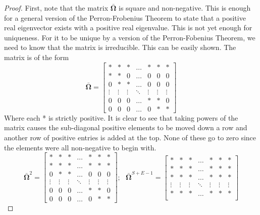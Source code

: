 \documentclass[letterpaper,12pt]{article}
\theoremstyle{definition}
\begin{document}
    \begin{proof}
      First, note that the matrix $\bm{\bar{\Omega}}$ is square and non-negative. This is enough for a general version of the Perron-Frobenius Theorem to state that a positive real eigenvector exists with a positive real eigenvalue. This is not yet enough for uniqueness. For it to be unique by a version of the Perron-Fobenius Theorem, we need to know that the matrix is irreducible. This can be easily shown. The matrix is of the form
      $$\bm{\bar{\Omega}} =
      \begin{bmatrix}
        * & *  & * & \hdots & * & * & *\\
        * & * & 0 & \hdots & 0 & 0 & 0 \\
        0 & * & * & \hdots & 0 & 0 & 0 \\
        \vdots & \vdots & \vdots & \ddots & \vdots & \vdots & \vdots \\
        0 & 0 & 0 & \hdots & *  & * & 0 \\
        0 & 0 & 0 & \hdots & 0 & * & *
      \end{bmatrix}
      $$
      Where each * is strictly positive. It is clear to see that taking powers of the matrix causes the sub-diagonal positive elements to be moved down a row and another row of positive entries is added at the top. None of these go to zero since the elements were all non-negative to begin with.
      $$\bm{\bar{\Omega}}^2 =
      \begin{bmatrix}
        * & *  & * & \hdots & * & * & *\\
        * & * & * & \hdots & * & * & * \\
        0 & * & * & \hdots & 0 & 0 & 0 \\
        \vdots & \vdots & \vdots & \ddots & \vdots & \vdots & \vdots \\
        0 & 0 & 0 & \hdots & *  & * & 0 \\
        0 & 0 & 0 & \hdots & 0 & * & *
      \end{bmatrix}; ~~~
      \bm{\bar{\Omega}}^{S+E-1} =
      \begin{bmatrix}
        * & *  & * & \hdots & * & * & *\\
        * & * & * & \hdots & * & * & * \\
        * & * & * & \hdots & * & * & * \\
        \vdots & \vdots & \vdots & \ddots & \vdots & \vdots & \vdots \\
        * & * & * & \hdots & *  & * & * \\

\end{bmatrix}$$
\end{proof}
\end{document}
